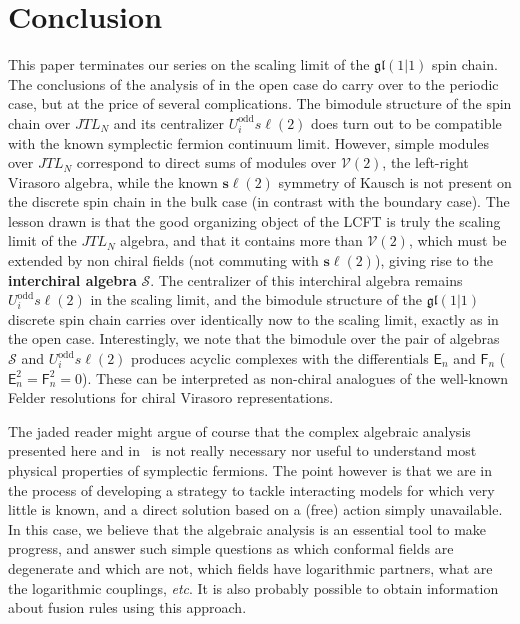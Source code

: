 \documentclass[11pt]{article}
\newcommand{\JTL}[1]{JTL_{#1}}
\newcommand{\LQGoddi}{U^{\text{odd}}_{i} s\ell(2)}
\newcommand{\F}{\mathsf{F}}
\newcommand{\FF}[1]{\F_{#1}}
\newcommand{\E}{\mathsf{E}}
\newcommand{\EE}[1]{\E_{#1}}
\newcommand{\VirN}{\boldsymbol{\mathcal{V}}}
\newcommand{\interchalg}{\mathcal{S}}
\newcommand{\nSU}{\boldsymbol{s\ell}}
\newcommand{\gl}{\mathfrak{gl}}
\theoremstyle{definition}
\begin{document}
\section{Conclusion}\label{sec:concl}
This paper terminates our series on the scaling limit of the $\gl(1|1)$
spin chain. The conclusions of the analysis of \cite{ReadSaleur07-2}
in the open case do carry over to the periodic case, but at the price
of several complications. The bimodule structure of the spin chain
over $\JTL{N}$ and its centralizer $\LQGoddi$ does turn out to be
compatible with the known symplectic fermion continuum limit. However,
simple modules over $\JTL{N}$ correspond to direct sums of modules over
$\VirN(2)$, the left-right Virasoro algebra, while the known $\nSU(2)$
symmetry of Kausch is not present on the discrete spin chain in the
bulk case (in contrast with the boundary case). The lesson drawn is
that the good organizing object of the LCFT is truly the scaling limit
of the $\JTL{N}$ algebra, and that it contains more than $\VirN(2)$,
which must be extended by non chiral fields (not commuting with
$\nSU(2)$), giving rise to the {\bf interchiral
algebra} $\interchalg$. The centralizer of this interchiral algebra
remains $\LQGoddi$ in the scaling limit, and the bimodule structure
of the $\gl(1|1)$ discrete spin chain carries over identically now to
the scaling limit, exactly as in the open case.
Interestingly, we  note that the bimodule  over the pair of algebras $\interchalg$
and $\LQGoddi$ produces  acyclic complexes with the differentials $\EE
n$ and $\FF n$ ($\EE{n}^2=\FF{n}^2=0$). These can be interpreted  as non-chiral analogues of
the well-known Felder resolutions for chiral Virasoro
representations.

\medskip

The jaded reader might argue of course that the complex algebraic analysis presented here and in~\cite{GRS1,GRS2} is not really necessary nor useful to
understand most physical properties of symplectic fermions. The point however is that we are in the process of developing a strategy to tackle interacting
models for which  very little is known, and a direct solution based on a (free) action simply unavailable. In this case, we believe that the algebraic analysis is an essential tool to make progress, and answer such simple questions as which conformal fields are degenerate and which are not, which fields have logarithmic partners, what are the logarithmic couplings, {\it etc}. It is also probably possible to obtain information about fusion rules using this approach.
\end{document}

